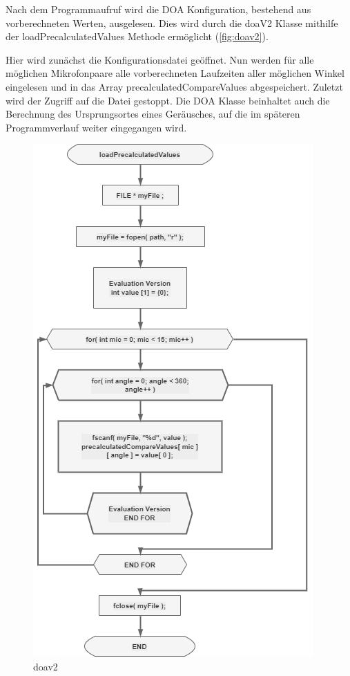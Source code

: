 Nach dem Programmaufruf wird die DOA Konfiguration, bestehend aus vorberechneten Werten, ausgelesen. Dies wird durch die doaV2 Klasse mithilfe der loadPrecalculatedValues Methode ermöglicht (\autoref{fig:doav2}).

Hier wird zunächst die Konfigurationsdatei geöffnet. Nun werden für alle möglichen Mikrofonpaare alle vorberechneten Laufzeiten aller möglichen Winkel eingelesen und in das Array precalculatedCompareValues abgespeichert. Zuletzt wird der Zugriff auf die Datei gestoppt. Die DOA Klasse beinhaltet auch die Berechnung des Ursprungsortes eines Geräusches, auf die im späteren Programmverlauf weiter eingegangen wird.

\begin{figure}[!h]
	\begin{center}
		\includegraphics[scale=0.5]{Sections/Programmierung/doav2}
	\end{center}
	\caption{doav2}
	\label{fig:doav2}
\end{figure}


